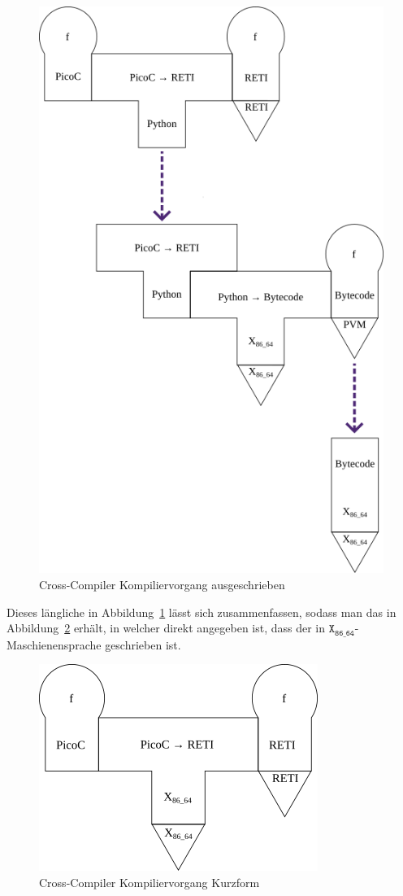 \begin{figure}[H]
  \centering
  \includegraphics[width=0.5\linewidth]{./figures/summarized_cross_compiler.png}
  \caption{Cross-Compiler Kompiliervorgang ausgeschrieben}
  \label{fig:cross_compiler_kompiliervorgang_ausgeschrieben}
\end{figure}

Dieses längliche  in Abbildung~\ref{fig:cross_compiler_kompiliervorgang_ausgeschrieben} lässt sich zusammenfassen, sodass man das  in Abbildung~\ref{fig:cross_compiler_kompiliervorgang_kurzform} erhält, in welcher direkt angegeben ist, dass der  in $\mathtt{X_{86\_64}}$-Maschienensprache geschrieben ist.

\begin{figure}[H]
  \centering
  \includegraphics[width=0.33\linewidth]{./figures/compiliervorang_mit_machiene.png}
  \caption{Cross-Compiler Kompiliervorgang Kurzform}
  \label{fig:cross_compiler_kompiliervorgang_kurzform}
\end{figure}

